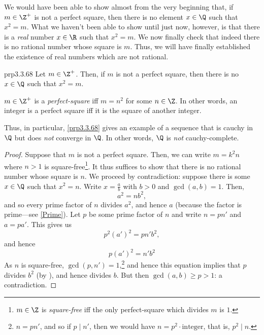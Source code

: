 We would have been able to show almost from the very beginning that, if $m\in \Z ^+$ is not a perfect square, then there is no element $x\in \Q$ such that $x^2=m$.  What we haven't been able to show until just now, however, is that there is a \emph{real} number $x\in \R$ such that $x^2=m$.  We now finally check that indeed there is no rational number whose square is $m$.  Thus, we will have finally established the existence of real numbers which are not rational.
\begin{prp}{}{prp3.3.68}
Let $m\in \Z ^+$.  Then, if $m$ is not a perfect square, then there is no $x\in \Q$ such that $x^2=m$.
\begin{rmk}
$m\in \Z ^+$ is a \emph{perfect-square} iff $m=n^2$ for some $n\in \Z$.  In other words, an integer is a perfect square iff it is the square of another integer.
\end{rmk}
\begin{rmk}
Thus, in particular, \cref{prp3.3.68} gives an example of a sequence that is cauchy in $\Q$ but does \emph{not} converge in $\Q$.  In other words, $\Q$ is \emph{not} cauchy-complete.
\end{rmk}
\begin{proof}
Suppose that $m$ is not a perfect square.  Then, we can write $m=k^2n$ where $n>1$ is square-free\footnote{$m\in \Z$ is \emph{square-free} iff the only perfect-square which divides $m$ is $1$.}.  It thus suffices to show that there is no rational number whose square is $n$.  We proceed by contradiction:  suppose there is some $x\in \Q$ such that $x^2=n$.  Write $x=\frac{a}{b}$ with $b>0$ and $\gcd (a,b)=1$.  Then,
\begin{equation}
a^2=nb^2,
\end{equation}
and so every prime factor of $n$ divides $a^2$, and hence $a$ (because the factor is prime---see \cref{Prime}).  Let $p$ be some prime factor of $n$ and write $n=pn'$ and $a=pa'$.  This gives us
\begin{equation}
p^2(a')^2=pn'b^2,
\end{equation}
and hence
\begin{equation}
p(a')^2=n'b^2
\end{equation}
As $n$ is square-free, $\gcd (p,n')=1$,\footnote{$n=pn'$, and so if $p\mid n'$, then we would have $n=p^2\cdot \text{integer}$, that is, $p^2\mid n$.} and hence this equation implies that $p$ divides $b^2$ (by ), and hence divides $b$.  But then $\gcd (a,b)\geq p>1$:  a contradiction.
\end{proof}
\end{prp}

